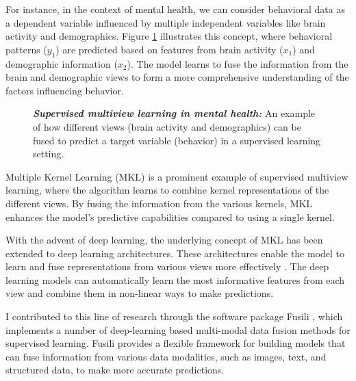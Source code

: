 For instance, in the context of mental health, we can consider behavioral data as a dependent variable influenced by multiple independent variables like brain activity and demographics. Figure \ref{fig:mentalhealthsupervised} illustrates this concept, where behavioral patterns ($y_1$) are predicted based on features from brain activity ($x_1$) and demographic information ($x_2$). The model learns to fuse the information from the brain and demographic views to form a more comprehensive understanding of the factors influencing behavior.

\begin{figure}
    \centering
        \caption[Supervised multiview learning in mental health]{\textit{\textbf{Supervised multiview learning in mental health:}} An example of how different views (brain activity and demographics) can be fused to predict a target variable (behavior) in a supervised learning setting.}\label{fig:mentalhealthsupervised}
\end{figure}

Multiple Kernel Learning (MKL) \citep{gonen2011multiple} is a prominent example of supervised multiview learning, where the algorithm learns to combine kernel representations of the different views. By fusing the information from the various kernels, MKL enhances the model's predictive capabilities compared to using a single kernel.

With the advent of deep learning, the underlying concept of MKL has been extended to deep learning architectures. These architectures enable the model to learn and fuse representations from various views more effectively \citep{guo2019deep}. The deep learning models can automatically learn the most informative features from each view and combine them in non-linear ways to make predictions.

I contributed to this line of research through the software package Fusili \citep{florence_townend_2023_10228564}, which implements a number of deep-learning based multi-modal data fusion methods for supervised learning. Fusili provides a flexible framework for building models that can fuse information from various data modalities, such as images, text, and structured data, to make more accurate predictions.

